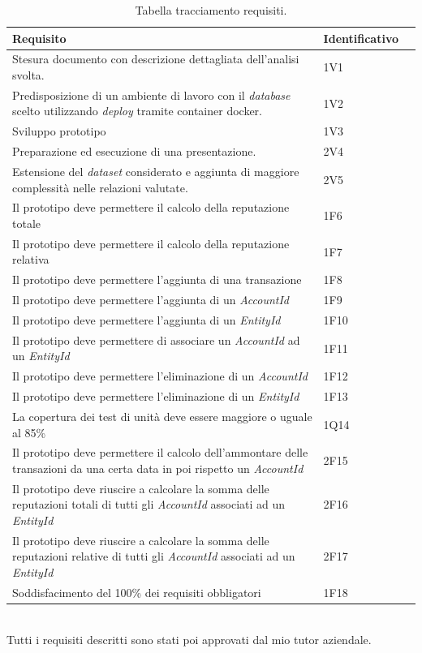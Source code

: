 \begin{table}[!ht]
\begin{tabularx}{\textwidth}{Xll}
\hline\hline
\textbf{Requisito} & \textbf{Identificativo} \\
\hline
Stesura documento con descrizione dettagliata dell'analisi svolta. & 1V1\\
\hline
Predisposizione di un ambiente di lavoro con il \textit{database} scelto utilizzando \textit{deploy} tramite container docker. & 1V2\\
\hline
Sviluppo prototipo & 1V3\\
\hline
Preparazione ed esecuzione di una presentazione. & 2V4\\
\hline
Estensione del \textit{dataset} considerato e aggiunta di maggiore complessità nelle relazioni valutate. & 2V5\\
\hline
Il prototipo deve permettere il calcolo della reputazione totale & 1F6\\
\hline
Il prototipo deve permettere il calcolo della reputazione relativa & 1F7\\
\hline
Il prototipo deve permettere l'aggiunta di una transazione & 1F8\\
\hline
Il prototipo deve permettere l'aggiunta di un \textit{AccountId} & 1F9\\
\hline
Il prototipo deve permettere l'aggiunta di un \textit{EntityId} & 1F10\\
\hline
Il prototipo deve permettere di associare un \textit{AccountId} ad un \textit{EntityId} & 1F11\\
\hline
Il prototipo deve permettere l'eliminazione di un \textit{AccountId} & 1F12\\
\hline
Il prototipo deve permettere l'eliminazione di un \textit{EntityId} & 1F13\\
\hline
La copertura dei test di unità deve essere maggiore o uguale al 85\% & 1Q14\\
\hline
Il prototipo deve permettere il calcolo dell'ammontare delle transazioni da una certa data in poi rispetto un \textit{AccountId} & 2F15\\
\hline
Il prototipo deve riuscire a calcolare la somma delle reputazioni totali di tutti gli \textit{AccountId} associati ad un \textit{EntityId} & 2F16\\
\hline
Il prototipo deve riuscire a calcolare la somma delle reputazioni relative di tutti gli \textit{AccountId} associati ad un \textit{EntityId} & 2F17\\
\hline
Soddisfacimento del 100\% dei requisiti obbligatori & 1F18\\
\hline
\end{tabularx}
\caption{Tabella tracciamento requisiti.}
\end{table}%
\\
Tutti i requisiti descritti sono stati poi approvati dal mio tutor aziendale.
\newpage
